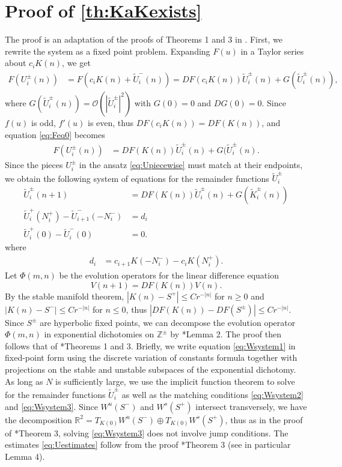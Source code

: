 \documentclass[12pt,reqno]{amsart}
\def\R{{\mathbb R}}
\def\Z{{\mathbb Z}}
\begin{document}
\section{Proof of \cref{th:KaKexists}}

The proof is an adaptation of the proofs of Theorems 1 and 3 in \cite{Parker2020}. First, we rewrite the system as a fixed point problem. Expanding $F(u)$ in a Taylor series about $c_i K(n)$, we get
\begin{align}\label{eq:Feq0}
F(U_i^\pm(n)) &= F(c_i K(n) + \tilde{U}_i^-(n)) = 
D F(c_i K(n)) \tilde{U}_i^\pm(n) + G(\tilde{U}_i^\pm(n)),
\end{align}
where $G(\tilde{U}_i^\pm(n)) = \mathcal{O}(|\tilde{U}_i^\pm|^2)$ with $G(0) = 0$ and $DG(0) = 0$. Since $f(u)$ is odd, $f'(u)$ is even, thus $D F(c_i K(n)) = D F(K(n))$, and equation \cref{eq:Feq0} becomes
\begin{align}\label{eq:Feq1}
F(U_i^\pm(n)) &= 
D F(K(n)) \tilde{U}_i^\pm(n) + G(\tilde{U}_i^\pm(n).
\end{align}
Since the pieces $U_i^\pm$ in the ansatz \cref{eq:Upiecewise} must match at their endpoints, we obtain the following system of equations for the remainder functions $\tilde{U}_i^\pm$
\begin{align}
\tilde{U}_i^\pm(n+1) &= D F(K(n)) \tilde{U}_i^\pm(n) + G(\tilde{K}_i^\pm(n)) \label{eq:Wsystem1} \\
\tilde{U}_i^+(N_i^+) - \tilde{U}_{i+1}^-(-N_i^-) &= d_i \label{eq:Wsystem2} \\
\tilde{U}_i^+(0) - \tilde{U}_i^-(0) &= 0. \label{eq:Wsystem3}
\end{align}
where
\begin{align}\label{didef}
	d_i &= c_{i+1} K(-N_i^-) - c_i K(N_i^+).
\end{align}
Let $\Phi(m, n)$ be the evolution operators for the linear difference equation 
\[
V(n+1) = D F(K(n)) V(n).
\]
By the stable manifold theorem, $|K(n) - S^+| \leq C r^{-|n|}$ for $n \geq 0$ and $|K(n) - S^-| \leq C r^{-|n|}$ for $n \leq 0$, thus $| DF(K(n)) - DF(S^\pm)| \leq C r^{-|n|}$. Since $S^\pm$ are hyperbolic fixed points, we can decompose the evolution operator $\Phi(m, n)$ in exponential dichotomies on $\Z^\pm$ by \cite{Parker2020}*{Lemma 2}. The proof then follows that of \cite{Parker2020}*{Theorems 1 and 3}. Briefly, we write equation \cref{eq:Wsystem1} in fixed-point form using the discrete variation of constants formula together with projections on the stable and unstable subspaces of the exponential dichotomy. As long as $N$ is sufficiently large, we use the implicit function theorem to solve for the remainder functions $\tilde{U}_i^\pm$ as well as the matching conditions \cref{eq:Wsystem2} and \cref{eq:Wsystem3}. Since $W^u(S^-)$ and $W^s(S^+)$ intersect transversely, we have the decomposition $\R^2 = T_{K(0)}W^u(S^-)\oplus T_{K(0)}W^s(S^+)$, thus as in the proof of \cite{Parker2020}*{Theorem 3}, solving \cref{eq:Wsystem3} does not involve jump conditions. The estimates \cref{eq:Uestimates} follow from the proof \cite{Parker2020}*{Theorem 3} (see in particular Lemma 4).
\end{document}
